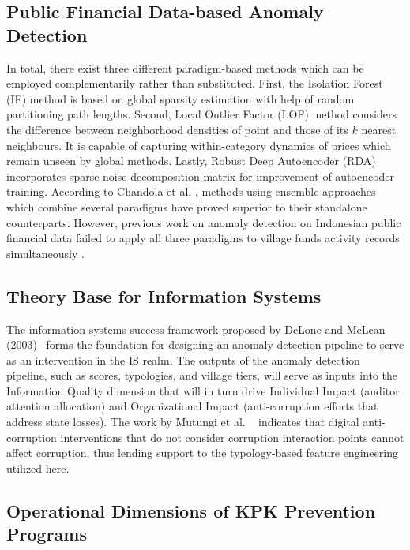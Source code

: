 \documentclass[3p,times,procedia]{elsarticle}
\begin{document}
\subsection{Public Financial Data-based Anomaly Detection}

In total, there exist three different paradigm-based methods which can be employed complementarily rather than substituted. First, the Isolation Forest (IF) method \cite{ref24,ref25} is based on global sparsity estimation with help of random partitioning path lengths. Second, Local Outlier Factor (LOF) method \cite{ref26} considers the difference between neighborhood densities of point and those of its $k$ nearest neighbours. It is capable of capturing within-category dynamics of prices which remain unseen by global methods. Lastly, Robust Deep Autoencoder (RDA) \cite{ref27} incorporates sparse noise decomposition matrix for improvement of autoencoder training. According to Chandola et al. \cite{ref28}, methods using ensemble approaches which combine several paradigms have proved superior to their standalone counterparts. However, previous work on anomaly detection on Indonesian public financial data failed to apply all three paradigms to village funds activity records simultaneously \cite{ref29,ref30}.


\subsection{Theory Base for Information Systems}

The information systems success framework proposed by DeLone and McLean (2003)~\cite{ref31} forms the foundation for designing an anomaly detection pipeline to serve as an intervention in the IS realm. The outputs of the anomaly detection pipeline, such as scores, typologies, and village tiers, will serve as inputs into the Information Quality dimension that will in turn drive Individual Impact (auditor attention allocation) and Organizational Impact (anti-corruption efforts that address state losses). The work by Mutungi et al. ~\cite{ref11} indicates that digital anti-corruption interventions that do not consider corruption interaction points cannot affect corruption, thus lending support to the typology-based feature engineering utilized here.


\subsection{Operational Dimensions of KPK Prevention Programs}
\label{sec:kpk_prevention}
\end{document}

